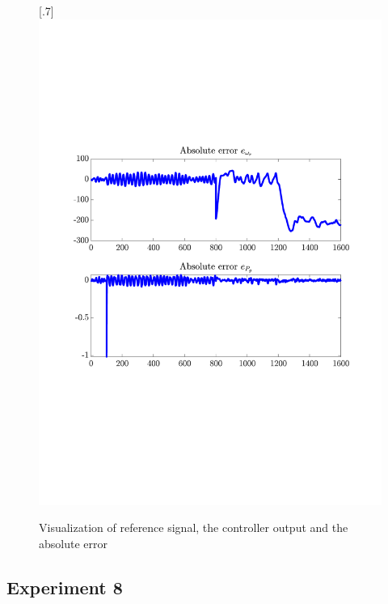 \begin{figure}[H]
[.7\textwidth]{\includegraphics[width=1\linewidth, scale=1, trim=55 230 55 120,clip]{fig/Open_loop/exp_7_error.pdf}}
    \caption{Visualization of reference signal, the controller output and the absolute error}
    \label{fig:app:cl_results:exp7}
\end{figure}

\subsection{Experiment 8}

